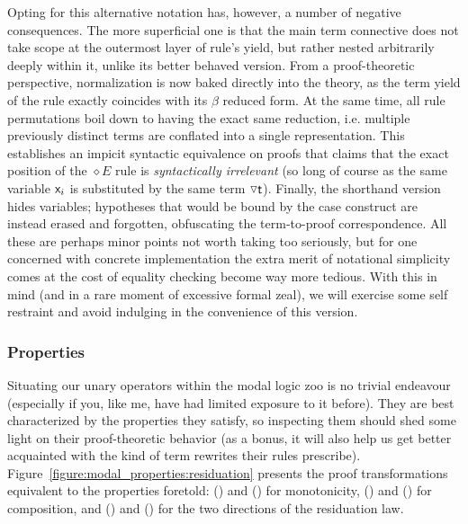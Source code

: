 Opting for this alternative notation has, however, a number of negative consequences.
The more superficial one is that the main term connective does not take scope at the outermost layer of rule's yield, but rather nested arbitrarily deeply within it, unlike its better behaved version.
From a proof-theoretic perspective, normalization is now baked directly into the theory, as the term yield of the rule exactly coincides with its $\beta$ reduced form.
At the same time, all rule permutations boil down to having the exact same reduction, i.e. multiple previously distinct terms are conflated into a single representation.
This establishes an impicit syntactic equivalence on proofs that claims that the exact position of the $\diamond E$ rule is \textit{syntactically irrelevant} (so long of course as the same variable $\mathsf{\mathsf{x}_{\mathnormal{i}} }$ is substituted by the same term $\smallterm{\diaelim t}$).
Finally, the shorthand version hides variables; hypotheses that would be bound by the case construct are instead erased and forgotten, obfuscating the term-to-proof correspondence.
All these are perhaps minor points not worth taking too seriously, but for one concerned with concrete implementation the extra merit of notational simplicity comes at the cost of equality checking become way more tedious.
With this in mind (and in a rare moment of excessive formal zeal), we will exercise some self restraint and avoid indulging in the convenience of this version.

\subsubsection{Properties}
Situating our unary operators within the modal logic zoo is no trivial endeavour (especially if you, like me, have had limited exposure to it before).
They are best characterized by the properties they satisfy, so inspecting them should shed some light on their proof-theoretic behavior (as a bonus, it will also help us get better acquainted with the kind of term rewrites their rules prescribe).
Figure~\ref{figure:modal_properties:residuation} presents the proof transformations equivalent to the properties foretold:
 () and () for monotonicity, () and () for composition, and () and () for the two directions of the residuation law.
 
